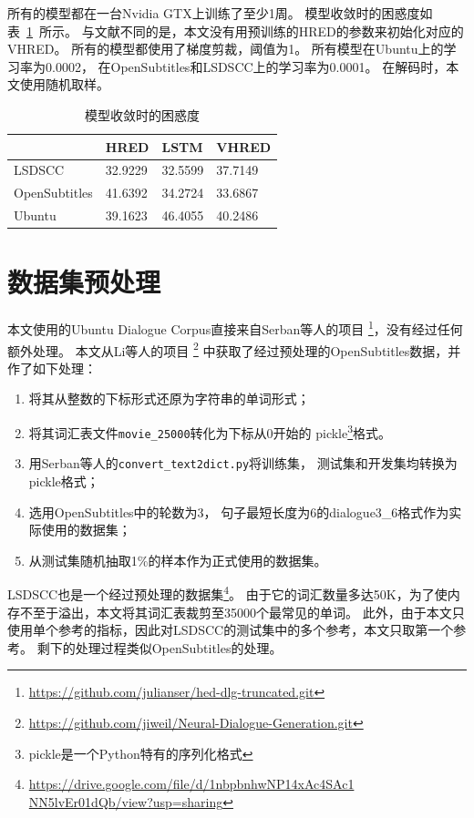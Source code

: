 所有的模型都在一台Nvidia GTX上训练了至少1周。
模型收敛时的困惑度如表~\ref{tab:converged_perplexity}~所示。
与文献\cite{VHRED}不同的是，本文没有用预训练的HRED的参数来初始化对应的VHRED。
所有的模型都使用了梯度剪裁，阈值为1。
所有模型在Ubuntu上的学习率为0.0002，
在OpenSubtitles和LSDSCC上的学习率为0.0001。
在解码时，本文使用随机取样。
\begin{table}
    \centering
    \caption{模型收敛时的困惑度}
    \label{tab:converged_perplexity}
    \begin{tabular}{llll}
        \toprule
        \midrule
        & HRED & LSTM & VHRED \\
        \midrule
        LSDSCC & 32.9229 & 32.5599 & 37.7149 \\
        OpenSubtitles & 41.6392 & 34.2724 & 33.6867 \\
        Ubuntu & 39.1623 & 46.4055 & 40.2486 \\
        \bottomrule
    \end{tabular}
\end{table}

\section{数据集预处理}
\label{sec:dataset_proprecessing}
本文使用的Ubuntu Dialogue Corpus直接来自Serban等人的项目
\footnote{\url{https://github.com/julianser/hed-dlg-truncated.git}}，没有经过任何额外处理。
本文从Li等人的项目
\footnote{\url{https://github.com/jiweil/Neural-Dialogue-Generation.git}}
中获取了经过预处理的OpenSubtitles数据，并作了如下处理：
\begin{enumerate}
    \item 将其从整数的下标形式还原为字符串的单词形式；
    \item 将其词汇表文件\texttt{movie\_25000}转化为下标从0开始的 pickle\footnote{pickle是一个Python特有的序列化格式}格式。
    \item 用Serban等人的\texttt{convert\_text2dict.py}将训练集，
    测试集和开发集均转换为pickle格式；
    \item 选用OpenSubtitles中的轮数为3， 句子最短长度为6的dialogue3\_6格式作为实际使用的数据集；
    \item 从测试集随机抽取1\%的样本作为正式使用的数据集。
\end{enumerate}

LSDSCC也是一个经过预处理的数据集\footnote{\url{https://drive.google.com/file/d/1nbpbnhwNP14xAc4SAc1 NN5lvEr01dQb/view?usp=sharing}}。
由于它的词汇数量多达50K，为了使内存不至于溢出，本文将其词汇表裁剪至35000个最常见的单词。
此外，由于本文只使用单个参考的指标，因此对LSDSCC的测试集中的多个参考，本文只取第一个参考。
剩下的处理过程类似OpenSubtitles的处理。

